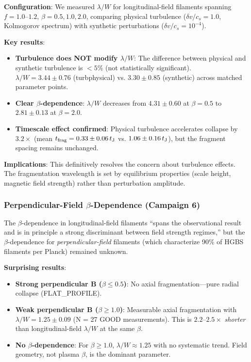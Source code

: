 \documentclass[twocolumn,usenatbib]{mnras}
\begin{document}
\textbf{Configuration}: We measured $\lambda/W$ for longitudinal-field filaments spanning $f = 1.0$--$1.2$, $\beta = 0.5, 1.0, 2.0$, comparing physical turbulence ($\delta v/c_s = 1.0$, Kolmogorov spectrum) with synthetic perturbations ($\delta v/c_s = 10^{-4}$).

\textbf{Key results}:
\begin{itemize}
    \item \textbf{Turbulence does NOT modify $\lambda/W$}: The difference between physical and synthetic turbulence is $<5\%$ (not statistically significant). $\lambda/W = 3.44 \pm 0.76$ (turbphysical) vs. $3.30 \pm 0.85$ (synthetic) across matched parameter points.
    \item \textbf{Clear $\beta$-dependence}: $\lambda/W$ decreases from $4.31 \pm 0.60$ at $\beta = 0.5$ to $2.81 \pm 0.13$ at $\beta = 2.0$.
    \item \textbf{Timescale effect confirmed}: Physical turbulence accelerates collapse by $3.2\times$ (mean $t_{\rm frag} = 0.33 \pm 0.06\,t_{\rm J}$ vs. $1.06 \pm 0.16\,t_{\rm J}$), but the fragment spacing remains unchanged.
\end{itemize}

\textbf{Implications}: This definitively resolves the concern about turbulence effects. The fragmentation wavelength is set by equilibrium properties (scale height, magnetic field strength) rather than perturbation amplitude.

\subsubsection{Perpendicular-Field $\beta$-Dependence (Campaign 6)}

The $\beta$-dependence in longitudinal-field filaments ``spans the observational result and is in principle a strong discriminant between field strength regimes,'' but the $\beta$-dependence for \textit{perpendicular-field} filaments (which characterize 90\% of HGBS filaments per Planck) remained unknown.

\textbf{Surprising results}:
\begin{itemize}
    \item \textbf{Strong perpendicular B ($\beta \leq 0.5$)}: No axial fragmentation---pure radial collapse (FLAT\_PROFILE).
    \item \textbf{Weak perpendicular B ($\beta \geq 1.0$)}: Measurable axial fragmentation with $\lambda/W = 1.25 \pm 0.09$ (N = 27 GOOD measurements). This is $2.2$--$2.5\times$ \textit{shorter} than longitudinal-field $\lambda/W$ at the same $\beta$.
    \item \textbf{No $\beta$-dependence}: For $\beta \geq 1.0$, $\lambda/W \approx 1.25$ with no systematic trend. Field geometry, not plasma $\beta$, is the dominant parameter.
\end{itemize}
\end{document}
